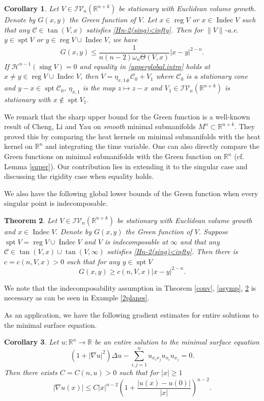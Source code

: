 \documentclass[11pt]{amsart}
\newtheorem{theorem}{Theorem}[section]
\newtheorem{corollary}[theorem]{Corollary}
\theoremstyle{definition}
\newcommand{\HH}{\mathcal{H}}
\newcommand{\R}{\mathbb{R}}
\newcommand{\C}{\mathcal{C}}
\newcommand{\IV}{\mathcal{IV}}
\DeclareMathOperator{\spt}{spt}
\DeclareMathOperator{\sing}{sing}
\DeclareMathOperator{\reg}{reg}
\DeclareMathOperator{\indec}{Indec}
\begin{document}
\begin{corollary}Let $V\in \IV_n(\R^{n+k})$ be stationary with Euclidean volume growth. Denote by $G(x,y)$ the Green function of $V$. Let $x\in \reg V$ or $x\in \indec  V$ such that any $\C\in \tan(V,x)$ satisfies \eqref{Hn-2(sing)<infty}. Then for $\|V\|$-a.e. $y\in \spt V$ or $y\in \reg V\cup \indec V$,  we have
	\begin{equation}\label{upperglobal.intro}
	    G(x,y)\le\frac{1}{n(n-2)\omega_n\Theta(V,x)}|x-y|^{2-n}.
	\end{equation}
	If $\HH^{n-1}(\sing V)=0$ and equality in \eqref{upperglobal.intro} holds at $x\neq y\in \reg V\cup \indec V$, then $V=\eta_{x,1\#}\C_0+V_1$ where $\C_0$ is a stationary cone and $y-x\in \spt \C_0$, $\eta_{x,1}$ is the map $z\mapsto z-x$ and $V_1\in \IV_n(\R^{n+k})$ is stationary with $x\notin \spt V_1$.
\end{corollary}

We remark that the sharp upper bound for the Green function is a well-known result of Cheng, Li and Yau \cite{CLY} on \textit{smooth} minimal submanifolds $M^n\subset \R^{n+k}$. They proved this by comparing the heat kernels on minimal submanifolds with the heat kernel on $\R^n$ and integrating the time variable. One can also directly compare the Green functions on minimal submanifolds with the Green function on $\R^n$ (cf. Lemma \ref{super}). Our contribution lies in extending it to the singular case and discussing the rigidity case when equality holds. 


We also have the following global lower bounds of the Green function when every singular point is indecomposable.
\begin{theorem}\label{lower.bound.intro}
    Let $V\in \IV_n(\R^{n+k})$ be stationary with Euclidean volume growth and $x\in \indec V$. Denote by $G(x,y)$ the Green function of $V$. Suppose $\spt V=\reg V\cup\indec V$ and $V$ is indecomposable at $\infty$ and that any $\C\in \tan(V,x)\cup  \tan(V,\infty)$ satisfies \eqref{Hn-2(sing)<infty}. Then there is $c=c(n,V,x)>0$ such that for any $y\in \spt V$
	\[ G(x,y)\ge c(n,V,x)|x-y|^{2-n}.\]
\end{theorem}

We note that the indecomposability assumption in Theorem \ref{conv}, \ref{asymp}, \ref{lower.bound.intro} is necessary as can be seen in Example \ref{2planes}.

As an application, we have the following gradient estimates for entire solutions to the minimal surface equation.
\begin{corollary}
	Let $u:\R^n\to \R$  be an entire solution to the minimal surface equation 
	\[(1+|\nabla u|^2)\Delta u-\sum_{i,j=1}^nu_{x_ix_j}u_{x_i}u_{x_j}=0.\]
	Then there exists $C=C(n,u)>0$ such that for $|x|\ge 1$
	\[|\nabla u(x)|\le C|x|^{n-2}\left(1+\frac{|u(x)-u(0)|}{|x|}\right)^{n-2}.\]
\end{corollary}
\end{document}
